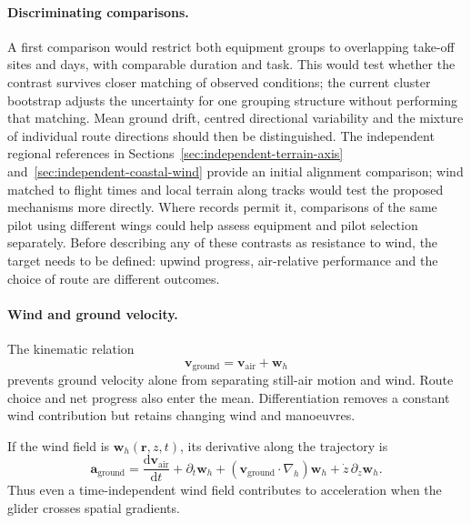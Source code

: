 \paragraph{Discriminating comparisons.}
A first comparison would restrict both equipment groups to overlapping take-off
sites and days, with comparable duration and task. This would test whether the
contrast survives closer matching of observed conditions; the current cluster
bootstrap adjusts the uncertainty for one grouping structure without performing
that matching. Mean ground drift, centred directional variability and the mixture
of individual route directions should then be distinguished. The independent
regional references in Sections~\ref{sec:independent-terrain-axis}
and~\ref{sec:independent-coastal-wind} provide an initial alignment comparison;
wind matched to flight times and local terrain along tracks would test the
proposed mechanisms more directly.
Where records permit it, comparisons of the same pilot using different wings could
help assess equipment and pilot selection separately. Before describing any of
these contrasts as resistance to wind, the target needs to be defined: upwind
progress, air-relative performance and the choice of route are different outcomes.

\paragraph{Wind and ground velocity.}

The kinematic relation
\begin{equation}
  \mathbf v_{\mathrm{ground}}=\mathbf v_{\mathrm{air}}+\mathbf w_h
  \label{eq:ground-air-wind}
\end{equation}
prevents ground velocity alone from separating still-air motion and wind.
Route choice and net progress also enter the mean. Differentiation removes a
constant wind contribution but retains changing wind and manoeuvres.

If the wind field is $\mathbf w_h(\mathbf r,z,t)$, its derivative along the trajectory is
\begin{equation}
 \mathbf a_{\mathrm{ground}}
 =\frac{\mathrm d\mathbf v_{\mathrm{air}}}{\mathrm dt}
  +\partial_t\mathbf w_h
  +(\mathbf v_{\mathrm{ground}}\!\cdot\nabla_h)\mathbf w_h
  +\dot z\,\partial_z\mathbf w_h.
 \label{eq:wind-acceleration}
\end{equation}
Thus even a time-independent wind field contributes to acceleration when the glider
crosses spatial gradients.

